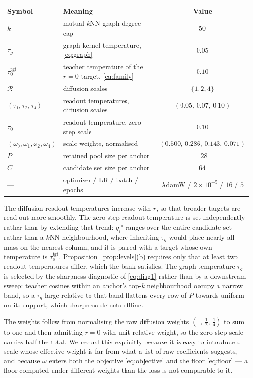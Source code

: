 \begin{table}[h]
\centering
\small
\begin{tabular}{llc}
\toprule
Symbol & Meaning & Value \\
\midrule
$k$ & mutual $k$NN graph degree cap & $50$ \\
$\tau_g$ & graph kernel temperature, \eqref{eq:graph} & $0.05$ \\
$\tau_0^{\mathrm{tgt}}$ & teacher temperature of the $r{=}0$ target, \eqref{eq:family} & $0.10$ \\
$\mathcal{R}$ & diffusion scales & $\{1,2,4\}$ \\
$(\tau_1,\tau_2,\tau_4)$ & readout temperatures, diffusion scales & $(0.05,\,0.07,\,0.10)$ \\
$\tau_0$ & readout temperature, zero-step scale & $0.10$ \\
$(\omega_0,\omega_1,\omega_2,\omega_4)$ & scale weights, normalised & $(0.500,\,0.286,\,0.143,\,0.071)$ \\
$P$ & retained pool size per anchor & $128$ \\
$C$ & candidate set size per anchor & $64$ \\
--- & optimiser / LR / batch / epochs & AdamW / $2{\times}10^{-5}$ / $16$ / $5$ \\
\bottomrule
\end{tabular}
\end{table}

The diffusion readout temperatures increase with $r$, so that broader targets are read out
more smoothly. The zero-step readout temperature is set independently rather than by
extending that trend: $q_i^{\tau_0}$ ranges over the entire candidate set rather than a
$k$NN neighbourhood, where inheriting $\tau_g$ would place nearly all mass on the nearest
column, and it is paired with a target whose own temperature is $\tau_0^{\mathrm{tgt}}$.
Proposition~\ref{prop:levels}(b) requires only that at least two readout temperatures
differ, which the bank satisfies. The graph temperature $\tau_g$ is selected by the
sharpness diagnostic of \eqref{eq:diag1} rather than by a downstream sweep: teacher cosines
within an anchor's top-$k$ neighbourhood occupy a narrow band, so a $\tau_g$ large relative
to that band flattens every row of $P$ towards uniform on its support, which sharpness
detects offline.

The weights follow from normalising the raw diffusion weights $(1,\,\tfrac12,\,\tfrac14)$
to sum to one and then admitting $r=0$ with unit relative weight, so the zero-step scale
carries half the total. We record this explicitly because it is easy to introduce a scale
whose effective weight is far from what a list of raw coefficients suggests, and because
$\omega$ enters both the objective \eqref{eq:objective} and the floor \eqref{eq:floor} ---
a floor computed under different weights than the loss is not comparable to it.

